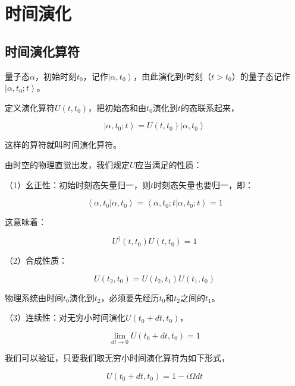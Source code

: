 \section{时间演化}

\subsection{时间演化算符}

量子态$\alpha$，初始时刻$t_0$，记作$\left| \alpha, t_0 \right\rangle$，由此演化到$t$时刻（$t > t_0$）的量子态记作$\left| \alpha, t_0; t \right\rangle$。

定义演化算符$U(t, t_0)$，把初始态和由$t_0$演化到$t$的态联系起来，

\begin{equation}
\left| \alpha, t_0; t \right\rangle = U(t, t_0) \left| \alpha, t_0 \right\rangle 
\end{equation}

这样的算符就叫时间演化算符。

由时空的物理直觉出发，我们规定$U$应当满足的性质：

（1）幺正性：初始时刻态矢量归一，则$t$时刻态矢量也要归一，即：

\begin{equation}
\left\langle \alpha, t_0 | \alpha, t_0 \right\rangle = \left\langle \alpha, t_0; t | \alpha, t_0; t \right\rangle = 1
\end{equation}

这意味着：

\begin{equation}
U^\dagger (t, t_0) U (t, t_0) = 1
\end{equation}

（2）合成性质：

\begin{equation}
U(t_2, t_0) = U(t_2, t_1) U (t_1, t_0)
\end{equation}

物理系统由时间$t_0$演化到$t_2$，必须要先经历$t_0$和$t_2$之间的$t_1$。

（3）连续性：对无穷小时间演化$U(t_0+ dt, t_0)$，

\begin{equation}
\lim\limits_{dt \to 0} U(t_0 + dt, t_0) = 1
\end{equation}

我们可以验证，只要我们取无穷小时间演化算符为如下形式，

\begin{equation}
U(t_0+dt, t_0) = 1- i \Omega dt
\end{equation}

